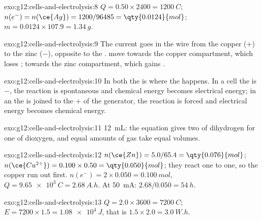 \begin{solution}{exo:g12:cells-and-electrolysis:8}
$Q = 0.50 \times 2400 = \qty{1200}{C}$; $n(e^-) = n(\ce{Ag}) =
1200/96485 = \qty{0.0124}{mol}$; $m = 0.0124 \times 107.9 =
\qty{1.34}{g}$.
\end{solution}

\begin{solution}{exo:g12:cells-and-electrolysis:9}
The current goes in the wire from the copper ($+$) to the zinc ($-$),
opposite to the .   move towards the copper
compartment, which loses ;   towards the zinc
compartment, which gains .
\end{solution}

\begin{solution}{exo:g12:cells-and-electrolysis:10}
In both the  is where the  happens. In a cell the 
is $-$, the reaction is spontaneous and chemical energy becomes
electrical energy; in an  the  is joined to the $+$ of
the generator, the reaction is forced and electrical energy becomes
chemical energy.
\end{solution}

\begin{solution}{exo:g12:cells-and-electrolysis:11}
\qty{12}{mL}: the equation  gives two  of
dihydrogen for one of dioxygen, and equal amounts of gas take equal
volumes.
\end{solution}

\begin{solution}{exo:g12:cells-and-electrolysis:12}
$n(\ce{Zn}) = 5.0/65.4 = \qty{0.076}{mol}$;
$n(\ce{Cu^{2+}}) = 0.100 \times 0.50 = \qty{0.050}{mol}$; they react
one to one, so the copper  run out first. $n(e^-) = 2 \times 0.050
= \qty{0.100}{mol}$, $Q = \qty{9.65e3}{C} = \qty{2.68}{A.h}$. At
\qty{50}{mA}: $2.68/0.050 = \qty{54}{h}$.
\end{solution}

\begin{solution}{exo:g12:cells-and-electrolysis:13}
$Q = 2.0 \times 3600 = \qty{7200}{C}$; $E = 7200 \times 1.5 =
\qty{1.08e4}{J}$, that is $1.5 \times 2.0 = \qty{3.0}{W.h}$.
\end{solution}

